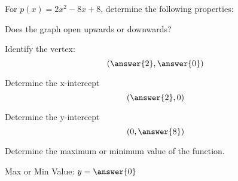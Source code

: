 \documentclass{ximera}
\author{David Kish}
\begin{document}
For $p(x) = 2x^2-8x+8$, determine the following properties:
\begin{exercise}
Does the graph open upwards or downwards?
\begin{multipleChoice}
\end{multipleChoice}
\end{exercise}
\begin{exercise}
Identify the vertex:
\[
(\answer{2},\answer{0})
\]
\end{exercise}
\begin{exercise}
Determine the x-intercept\\
\[
(\answer{2},0)
\]
\end{exercise}
\begin{exercise}
Determine the y-intercept
\[
(0,\answer{8})
\]
\end{exercise}
\begin{exercise}
Determine the maximum or minimum value of the function.
\begin{multipleChoice}
\end{multipleChoice}
Max or Min Value: $y = \answer{0}$
\end{exercise}
\end{document}
